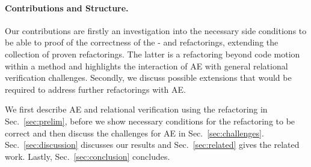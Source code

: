\paragraph{Contributions and Structure.}
Our contributions are firstly an investigation into the necessary side conditions to be able to proof of the correctness of the - and  refactorings, extending the collection of proven refactorings.
The latter is a refactoring beyond code motion within a method and highlights the interaction of AE with general relational verification challenges.
Secondly, we discuss possible extensions that would be required to address further refactorings with AE.

We first describe AE and relational verification using the  refactoring in Sec.~\ref{sec:prelim}, before we show necessary conditions for the  refactoring to be correct  and then discuss the challenges for AE in Sec.~\ref{sec:challenges}.
Sec.~\ref{sec:discussion} discusses our results and Sec.~\ref{sec:related} gives the related work. Lastly, Sec.~\ref{sec:conclusion} concludes.




